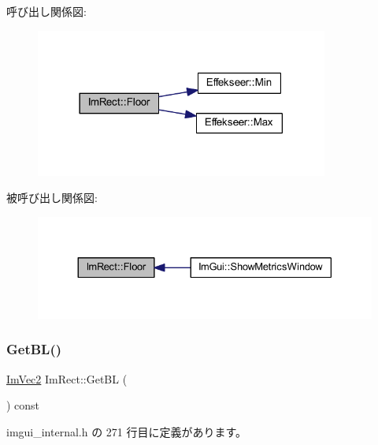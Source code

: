 呼び出し関係図\+:\nopagebreak
\begin{figure}[H]
\begin{center}
\leavevmode
\includegraphics[width=273pt]{struct_im_rect_a8fdf75a0c64ff29f65113cd9f8be77ab_cgraph}
\end{center}
\end{figure}
被呼び出し関係図\+:\nopagebreak
\begin{figure}[H]
\begin{center}
\leavevmode
\includegraphics[width=330pt]{struct_im_rect_a8fdf75a0c64ff29f65113cd9f8be77ab_icgraph}
\end{center}
\end{figure}
\mbox{\label{struct_im_rect_a59d9751bc7be6745dddf5b83b9155669}} 
\subsubsection{\texorpdfstring{Get\+B\+L()}{GetBL()}}
{\footnotesize\ttfamily \mbox{\hyperlink{struct_im_vec2}{Im\+Vec2}} Im\+Rect\+::\+Get\+BL (\begin{DoxyParamCaption}{ }\end{DoxyParamCaption}) const\hspace{0.3cm}{\ttfamily [inline]}}



 imgui\+\_\+internal.\+h の 271 行目に定義があります。

